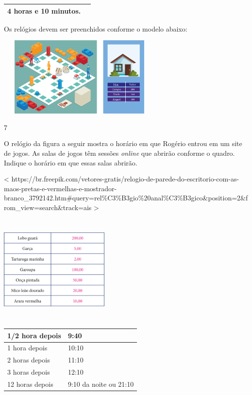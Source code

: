 {{{{{\begin{longtable}[]{@{}ll@{}}
\begin{minipage}[t]{0.48\columnwidth}
4 horas e 10 minutos.\strut
\end{minipage}\tabularnewline
\bottomrule
\end{longtable}

Os relógios devem ser preenchidos conforme o modelo abaixo:


\includegraphics[width=3.23958in,height=1.57255in]{media/image62.png}

\num{7}

O relógio da figura a seguir mostra o horário em que Rogério entrou em um
site de jogos. As salas de jogos têm sessões \emph{online} que abrirão
conforme o quadro. Indique o horário em que essas salas abrirão.

\textless{}
https://br.freepik.com/vetores-gratis/relogio-de-parede-do-escritorio-com-as-maos-pretas-e-vermelhas-e-mostrador-branco\_3792142.htm\#query=rel\%C3\%B3gio\%20anal\%C3\%B3gico\&position=2\&from\_view=search\&track=ais
\textgreater{}

\includegraphics[width=2.15625in,height=2.15625in]{media/image63.png}

\begin{longtable}[]{@{}ll@{}}
\toprule
1/2 hora depois & 9:40\tabularnewline
\midrule
\endhead
1 hora depois & 10:10\tabularnewline
2 horas depois & 11:10\tabularnewline
3 horas depois & 12:10\tabularnewline
12 horas depois & 9:10 da noite ou 21:10\tabularnewline
\bottomrule
\end{longtable}

}}}}}
